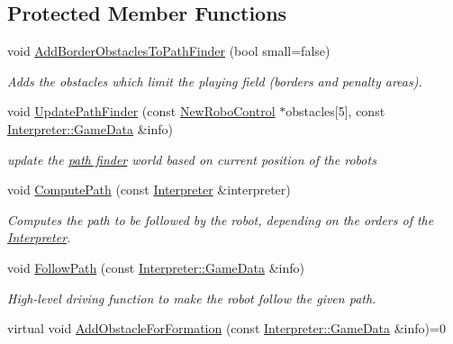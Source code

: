 \subsection*{Protected Member Functions}
\begin{DoxyCompactItemize}
\item 
void \hyperlink{classTeamRobot_acf4c435c98bc406744a12cd140d6631d}{AddBorderObstaclesToPathFinder} (bool small=false)
\begin{DoxyCompactList}\small\item\em Adds the obstacles which limit the playing field (borders and penalty areas). \item\end{DoxyCompactList}\item 
void \hyperlink{classTeamRobot_a1216ffb71821002b6e6845390c990d5f}{UpdatePathFinder} (const \hyperlink{classNewRoboControl}{NewRoboControl} $\ast$obstacles\mbox{[}5\mbox{]}, const \hyperlink{structInterpreter_1_1GameData}{Interpreter::GameData} \&info)
\begin{DoxyCompactList}\small\item\em update the \hyperlink{classPathFinder}{path finder} world based on current position of the robots \item\end{DoxyCompactList}\item 
void \hyperlink{classTeamRobot_a9ae431d9eeaa1d16fa28c636499ab553}{ComputePath} (const \hyperlink{classInterpreter}{Interpreter} \&interpreter)
\begin{DoxyCompactList}\small\item\em Computes the path to be followed by the robot, depending on the orders of the \hyperlink{classInterpreter}{Interpreter}. \item\end{DoxyCompactList}\item 
void \hyperlink{classTeamRobot_a02df00aae0a514badc93a9b2593be85f}{FollowPath} (const \hyperlink{structInterpreter_1_1GameData}{Interpreter::GameData} \&info)
\begin{DoxyCompactList}\small\item\em High-\/level driving function to make the robot follow the given path. \item\end{DoxyCompactList}\item 
virtual void \hyperlink{classTeamRobot_a71ec65db46db1ac511fe17b668d4f192}{AddObstacleForFormation} (const \hyperlink{structInterpreter_1_1GameData}{Interpreter::GameData} \&info)=0
\end{DoxyCompactItemize}
